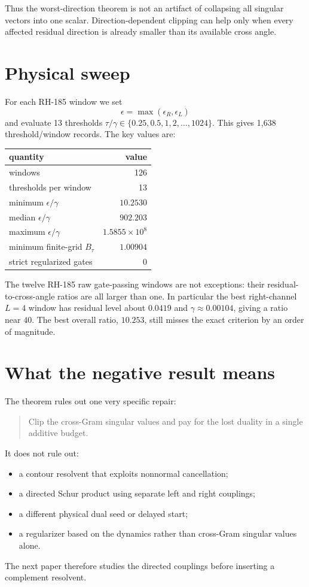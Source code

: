\documentclass[12pt]{article}
\theoremstyle{remark}
\begin{document}
Thus the worst-direction theorem is not an artifact of collapsing all
singular vectors into one scalar.  Direction-dependent clipping can help
only when every affected residual direction is already smaller than its
available cross angle.

\section{Physical sweep}

For each RH-185 window we set
\begin{equation}\label{eq:epsilon}
 \epsilon=\max(\epsilon_R,\epsilon_L)
\end{equation}
and evaluate 13 thresholds
$\tau/\gamma\in\{0.25,0.5,1,2,\ldots,1024\}$.  This gives 1,638
threshold/window records.  The key values are:
\begin{center}
\begin{tabular}{lr}
\toprule
quantity & value\\
\midrule
windows & 126\\
thresholds per window & 13\\
minimum $\epsilon/\gamma$ & $10.2530$\\
median $\epsilon/\gamma$ & $902.203$\\
maximum $\epsilon/\gamma$ & $1.5855\times10^8$\\
minimum finite-grid $B_\tau$ & $1.00904$\\
strict regularized gates & 0\\
\bottomrule
\end{tabular}
\end{center}

The twelve RH-185 raw gate-passing windows are not exceptions: their
residual-to-cross-angle ratios are all larger than one.  In particular the
best right-channel $L=4$ window has residual level about $0.0419$ and
$\gamma\approx0.00104$, giving a ratio near $40$.  The best overall ratio,
$10.253$, still misses the exact criterion by an order of magnitude.

\section{What the negative result means}

The theorem rules out one very specific repair:
\begin{quote}\label{eq:branch-no-go}
Clip the cross-Gram singular values and pay for the lost duality in a single
additive budget.
\end{quote}
It does not rule out:
\begin{itemize}[leftmargin=2em]
\item a contour resolvent that exploits nonnormal cancellation;
\item a directed Schur product using separate left and right couplings;
\item a different physical dual seed or delayed start;
\item a regularizer based on the dynamics rather than cross-Gram singular
 values alone.
\end{itemize}
The next paper therefore studies the directed couplings before inserting a
complement resolvent.
\end{document}
